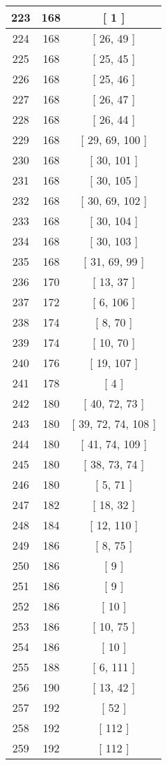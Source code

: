 \begin{center}
\begin{longtable}[H]{|| c c c ||}
223 & 168 & [ 1 ]
\\\hline
224 & 168 & [ 26, 49 ]
\\\hline
225 & 168 & [ 25, 45 ]
\\\hline
226 & 168 & [ 25, 46 ]
\\\hline
227 & 168 & [ 26, 47 ]
\\\hline
228 & 168 & [ 26, 44 ]
\\\hline
229 & 168 & [ 29, 69, 100 ]
\\\hline
230 & 168 & [ 30, 101 ]
\\\hline
231 & 168 & [ 30, 105 ]
\\\hline
232 & 168 & [ 30, 69, 102 ]
\\\hline
233 & 168 & [ 30, 104 ]
\\\hline
234 & 168 & [ 30, 103 ]
\\\hline
235 & 168 & [ 31, 69, 99 ]
\\\hline
236 & 170 & [ 13, 37 ]
\\\hline
237 & 172 & [ 6, 106 ]
\\\hline
238 & 174 & [ 8, 70 ]
\\\hline
239 & 174 & [ 10, 70 ]
\\\hline
240 & 176 & [ 19, 107 ]
\\\hline
241 & 178 & [ 4 ]
\\\hline
242 & 180 & [ 40, 72, 73 ]
\\\hline
243 & 180 & [ 39, 72, 74, 108 ]
\\\hline
244 & 180 & [ 41, 74, 109 ]
\\\hline
245 & 180 & [ 38, 73, 74 ]
\\\hline
246 & 180 & [ 5, 71 ]
\\\hline
247 & 182 & [ 18, 32 ]
\\\hline
248 & 184 & [ 12, 110 ]
\\\hline
249 & 186 & [ 8, 75 ]
\\\hline
250 & 186 & [ 9 ]
\\\hline
251 & 186 & [ 9 ]
\\\hline
252 & 186 & [ 10 ]
\\\hline
253 & 186 & [ 10, 75 ]
\\\hline
254 & 186 & [ 10 ]
\\\hline
255 & 188 & [ 6, 111 ]
\\\hline
256 & 190 & [ 13, 42 ]
\\\hline
257 & 192 & [ 52 ]
\\\hline
258 & 192 & [ 112 ]
\\\hline
259 & 192 & [ 112 ]

\end{longtable}
\end{center}
